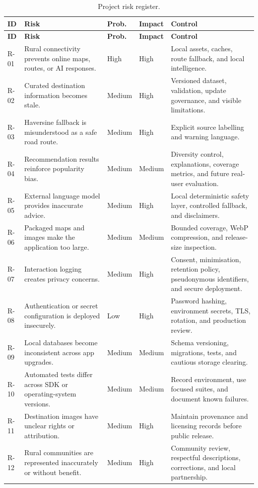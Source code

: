 \begin{longtable}{p{1.2cm}p{4.7cm}p{1.8cm}p{1.8cm}p{3.9cm}}
\caption{Project risk register.}\label{tbl:risk_register}\\
\toprule
\textbf{ID} & \textbf{Risk} & \textbf{Prob.} & \textbf{Impact} & \textbf{Control} \\
\midrule
\endfirsthead
\toprule
\textbf{ID} & \textbf{Risk} & \textbf{Prob.} & \textbf{Impact} & \textbf{Control} \\
\midrule
\endhead
R-01 & Rural connectivity prevents online maps, routes, or AI responses. & High & High & Local assets, caches, route fallback, and local intelligence. \\
R-02 & Curated destination information becomes stale. & Medium & High & Versioned dataset, validation, update governance, and visible limitations. \\
R-03 & Haversine fallback is misunderstood as a safe road route. & Medium & High & Explicit source labelling and warning language. \\
R-04 & Recommendation results reinforce popularity bias. & Medium & Medium & Diversity control, explanations, coverage metrics, and future real-user evaluation. \\
R-05 & External language model provides inaccurate advice. & Medium & High & Local deterministic safety layer, controlled fallback, and disclaimers. \\
R-06 & Packaged maps and images make the application too large. & Medium & Medium & Bounded coverage, WebP compression, and release-size inspection. \\
R-07 & Interaction logging creates privacy concerns. & Medium & High & Consent, minimisation, retention policy, pseudonymous identifiers, and secure deployment. \\
R-08 & Authentication or secret configuration is deployed insecurely. & Low & High & Password hashing, environment secrets, TLS, rotation, and production review. \\
R-09 & Local databases become inconsistent across app upgrades. & Medium & Medium & Schema versioning, migrations, tests, and cautious storage clearing. \\
R-10 & Automated tests differ across SDK or operating-system versions. & Medium & Medium & Record environment, use focused suites, and document known failures. \\
R-11 & Destination images have unclear rights or attribution. & Medium & High & Maintain provenance and licensing records before public release. \\
R-12 & Rural communities are represented inaccurately or without benefit. & Medium & High & Community review, respectful descriptions, corrections, and local partnership. \\
\bottomrule
\end{longtable}

